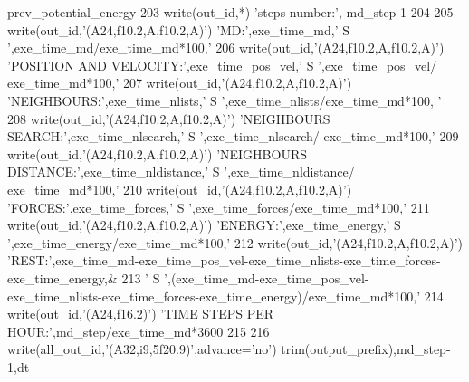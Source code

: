 \begin{DoxyCode}
      prev\_potential\_energy
203 \textcolor{keyword}{write}(out\_id,*) \textcolor{stringliteral}{'steps number:'}, md\_step-1
204 
205 \textcolor{keyword}{write}(out\_id,\textcolor{stringliteral}{'(A24,f10.2,A,f10.2,A)'}) \textcolor{stringliteral}{'MD:'},exe\_time\_md,\textcolor{stringliteral}{' S '},exe\_time\_md/exe\_time\_md*100,\textcolor{stringliteral}{'%
206 \textcolor{keyword}{write}(out\_id,\textcolor{stringliteral}{'(A24,f10.2,A,f10.2,A)'}) \textcolor{stringliteral}{'POSITION AND VELOCITY:'},exe\_time\_pos\_vel,\textcolor{stringliteral}{' S '},exe\_time\_pos\_vel/
      exe\_time\_md*100,\textcolor{stringliteral}{'%
207 \textcolor{keyword}{write}(out\_id,\textcolor{stringliteral}{'(A24,f10.2,A,f10.2,A)'}) \textcolor{stringliteral}{'NEIGHBOURS:'},exe\_time\_nlists,\textcolor{stringliteral}{' S '},exe\_time\_nlists/exe\_time\_md*100,\textcolor{stringliteral}{
      '%
208 \textcolor{keyword}{write}(out\_id,\textcolor{stringliteral}{'(A24,f10.2,A,f10.2,A)'}) \textcolor{stringliteral}{'NEIGHBOURS SEARCH:'},exe\_time\_nlsearch,\textcolor{stringliteral}{' S '},exe\_time\_nlsearch/
      exe\_time\_md*100,\textcolor{stringliteral}{'%
209 \textcolor{keyword}{write}(out\_id,\textcolor{stringliteral}{'(A24,f10.2,A,f10.2,A)'}) \textcolor{stringliteral}{'NEIGHBOURS DISTANCE:'},exe\_time\_nldistance,\textcolor{stringliteral}{' S '},exe\_time\_nldistance/
      exe\_time\_md*100,\textcolor{stringliteral}{'%
210 \textcolor{keyword}{write}(out\_id,\textcolor{stringliteral}{'(A24,f10.2,A,f10.2,A)'}) \textcolor{stringliteral}{'FORCES:'},exe\_time\_forces,\textcolor{stringliteral}{' S '},exe\_time\_forces/exe\_time\_md*100,\textcolor{stringliteral}{'%
211 \textcolor{keyword}{write}(out\_id,\textcolor{stringliteral}{'(A24,f10.2,A,f10.2,A)'}) \textcolor{stringliteral}{'ENERGY:'},exe\_time\_energy,\textcolor{stringliteral}{' S '},exe\_time\_energy/exe\_time\_md*100,\textcolor{stringliteral}{'%
212 \textcolor{keyword}{write}(out\_id,\textcolor{stringliteral}{'(A24,f10.2,A,f10.2,A)'}) \textcolor{stringliteral}{'REST:'},exe\_time\_md-exe\_time\_pos\_vel-exe\_time\_nlists-exe\_time\_forces-
      exe\_time\_energy,&
213 \textcolor{stringliteral}{' S '},(exe\_time\_md-exe\_time\_pos\_vel-exe\_time\_nlists-exe\_time\_forces-exe\_time\_energy)/exe\_time\_md*100,\textcolor{stringliteral}{'%
214 \textcolor{keyword}{write}(out\_id,\textcolor{stringliteral}{'(A24,f16.2)'}) \textcolor{stringliteral}{'TIME STEPS PER HOUR:'},md\_step/exe\_time\_md*3600
215 
216 \textcolor{keyword}{write}(all\_out\_id,\textcolor{stringliteral}{'(A32,i9,5f20.9)'},advance=\textcolor{stringliteral}{'no'}) trim(output\_prefix),md\_step-1,dt%
}}}}}}}}
\end{DoxyCode}
